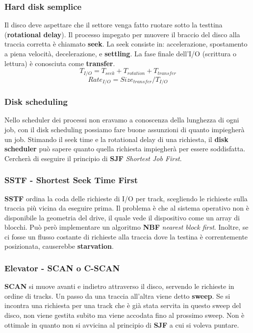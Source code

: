 \documentclass[12pt, twoside, letterpaper]{article}
\begin{document}
			\subsubsection{Hard disk semplice}
				Il disco deve aspettare che il settore venga fatto ruotare sotto la testtina (\textbf{rotational delay}). Il processo impegato per muovere il braccio del disco alla traccia corretta è chiamato \textbf{seek}. La seek consiste in: accelerazione, spostamento a piena velocità, decelerazione, e \textbf{settling}. La fase finale dell'I/O (scrittura o lettura) è conosciuta come \textbf{transfer}. 
				$$T_{I/O} = T_{seek} + T_{rotation} + T_{transfer}$$
				$$Rate_{I/O} = Size_{transfer} / T_{I/O}$$
				
			\subsubsection{Disk scheduling}
				Nello scheduler dei processi non eravamo a conoscenza della lunghezza di ogni job, con il disk scheduling possiamo fare buone assunzioni di quanto impiegherà un job. Stimando il seek time e la rotational delay di una richiesta, il \textbf{disk scheduler} può sapere quanto quella richiesta impiegherà per essere soddisfatta. Cercherà di eseguire il principio di \textbf{SJF} \textit{Shortest Job First}.
				
			\subsubsection{SSTF - Shortest Seek Time First}
				\textbf{SSTF} ordina la coda delle richieste di I/O per track, scegliendo le richieste sulla traccia più vicina da eseguire prima. Il problema è che al sistema operativo non è disponibile la geometria del drive, il quale vede il dispositivo come un array di blocchi. Può però implementare un algoritmo \textbf{NBF} \textit{nearest block first}. Inoltre, se ci fosse un flusso costante di richieste alla traccia dove la testina è correntemente posizionata, causerebbe \textbf{starvation}.
				
			\subsubsection{Elevator - SCAN o C-SCAN}
				\textbf{SCAN} si muove avanti e indietro attraverso il disco, servendo le richieste in ordine di tracks. Un passo da una traccia all'altra viene detto \textbf{sweep}. Se si incontra una richiesta per una track che è già stata servita in questo sweep del disco, non viene gestita subito ma viene accodata fino al prossimo sweep. Non è ottimale in quanto non si avvicina al principio di \textbf{SJF} a cui si voleva puntare.
				
\end{document}
